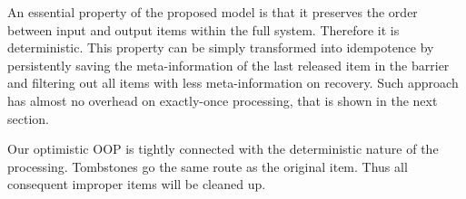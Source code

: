 \label {fs-short-discussion}

An essential property of the proposed model is that it preserves the order between input and output items within the full system. Therefore it is deterministic. This property can be simply transformed into idempotence by persistently saving the meta-information of the last released item in the barrier and filtering out all items with less meta-information on recovery. Such approach has almost no overhead on exactly-once processing, that is shown in the next section. 

Our optimistic OOP is tightly connected with the deterministic nature of the processing. Tombstones go the same route as the original item. Thus all consequent improper items will be cleaned up.
